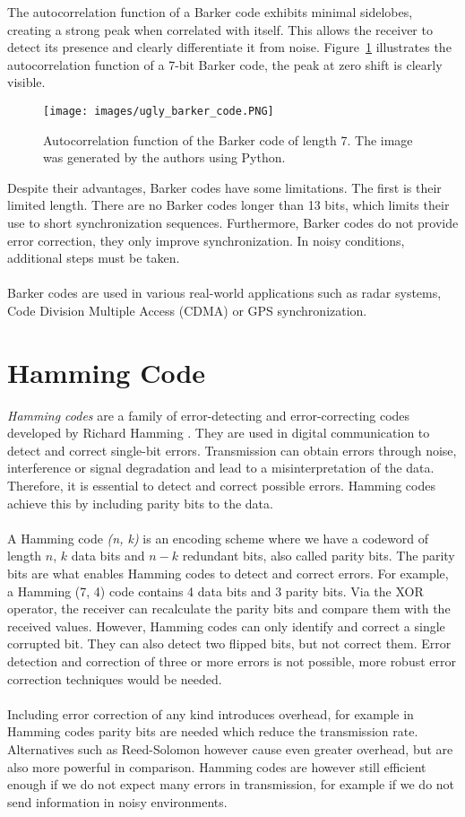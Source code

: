 The autocorrelation function of a Barker code exhibits minimal sidelobes, creating a strong peak when correlated with itself. This allows the receiver to detect its presence and clearly differentiate it from noise. Figure~\ref{fig:barker_code} illustrates the autocorrelation function of a 7-bit Barker code, the peak at zero shift is clearly visible.
\begin{figure}[h]
    \centering
    \texttt{[image: images/ugly\_barker\_code.PNG]}
    \caption{Autocorrelation function of the Barker code of length 7. The image was generated by the authors using Python.}
    \label{fig:barker_code}
\end{figure}
Despite their advantages, Barker codes have some limitations. The first is their limited length. There are no Barker codes longer than 13 bits, which limits their use to short synchronization sequences. Furthermore, Barker codes do not provide error correction, they only improve synchronization. In noisy conditions, additional steps must be taken.
\\ \\
Barker codes are used in various real-world applications such as radar systems, Code Division Multiple Access (CDMA) or GPS synchronization.

\section{Hamming Code}
\textit{Hamming codes} are a family of error-detecting and error-correcting codes developed by Richard Hamming \cite{hamming1950error}. They are used in digital communication to detect and correct single-bit errors. Transmission can obtain errors through noise, interference or signal degradation and lead to a misinterpretation of the data. Therefore, it is essential to detect and correct possible errors. Hamming codes achieve this by including parity bits to the data.
\\ \\
A Hamming code \textit{(n, k)} is an encoding scheme where we have a codeword of length $n$, $k$ data bits and $n-k$ redundant bits, also called parity bits. The parity bits are what enables Hamming codes to detect and correct errors. For example, a Hamming (7, 4) code contains 4 data bits and 3 parity bits. Via the XOR operator, the receiver can recalculate the parity bits and compare them with the received values. However, Hamming codes can only identify and correct a single corrupted bit. They can also detect two flipped bits, but not correct them. Error detection and correction of three or more errors is not possible, more robust error correction techniques would be needed. 
\\ \\
Including error correction of any kind introduces overhead, for example in Hamming codes parity bits are needed which reduce the transmission rate. Alternatives such as Reed-Solomon however cause even greater overhead, but are also more powerful in comparison. Hamming codes are however still efficient enough if we do not expect many errors in transmission, for example if we do not send information in noisy environments.